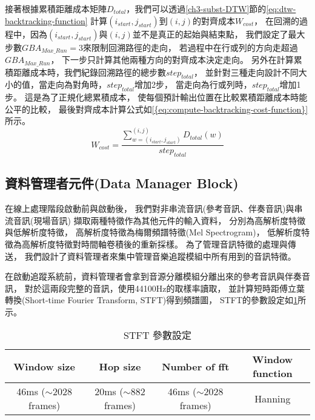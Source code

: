 \documentclass[class=NCU_thesis, crop=false]{standalone}
\begin{document}
接著根據累積距離成本矩陣$D_{total}$，我們可以透過\ref{ch3-subst-DTW}節的\cref{eq:dtw-backtracking-function}
計算$(i_{start}, j_{start})$到$(i, j)$的對齊成本$W_{cost}$，
在回溯的過程中，因為$(i_{start}, j_{start})$與$(i, j)$並不是真正的起始與結束點，
我們設定了最大步數$GBA_{Max\_Run}=3$來限制回溯路徑的走向，
若過程中在行或列的方向走超過$GBA_{Max\_Run}$，
下一步只計算其他兩種方向的對齊成本決定走向。
另外在計算累積距離成本時，我們紀錄回溯路徑的總步數$step_{total}$，
並針對三種走向設計不同大小的值，當走向為對角時，$step_{total}$增加2步，
當走向為行或列時，$step_{total}$增加1步。
這是為了正規化總累積成本，
使每個預計輸出位置在比較累積距離成本時能公平的比較，
最後對齊成本計算公式如\cref{{eq:compute-backtracking-cost-function}}所示。
\begin{equation}
    \label{eq:compute-backtracking-cost-function}
    W_{cost} = \frac{\sum_{w = (i_{start}, j_{start})}^{(i, j)}D_{total}(w)}{step_{total}} 
\end{equation}



\subsection{資料管理者元件(Data Manager Block)} \label{ch3-subst-data-manager}
在線上處理階段啟動前與啟動後，
我們對非串流音訊(參考音訊、伴奏音訊)與串流音訊(現場音訊)
擷取兩種特徵作為其他元件的輸入資料，
分別為高解析度特徵與低解析度特徵，
高解析度特徵為梅爾頻譜特徵(Mel Spectrogram)\cite{abdul2022mel}，
低解析度特徵為高解析度特徵對時間軸卷積後的重新採樣。
為了管理音訊特徵的處理與傳送，
我們設計了資料管理者來集中管理音樂追蹤模組中所有用到的音訊特徵。

在啟動追蹤系統前，資料管理者會拿到音源分離模組分離出來的參考音訊與伴奏音訊，
對於這兩段完整的音訊，使用44100Hz的取樣率讀取，
並計算短時距傅立葉轉換(Short-time Fourier Transform, STFT)得到頻譜圖，
STFT的參數設定如\cref{table:table-stft-parameter-setting}所示。

\begin{table}[h]
    \centering
    \caption{STFT 參數設定}
    \label{table:table-stft-parameter-setting}
    \begin{tabular}{|c|c|c|c|}
        \hline
        \multicolumn{1}{|c|}{Window size} & \multicolumn{1}{|c|}{Hop size} & \multicolumn{1}{|c|}{Number of fft} & \multicolumn{1}{|c|}{Window function}\\
        \hline
        46ms ($\sim 2028$ frames) & 20ms ($\sim 882$ frames) & 46ms ($\sim 2028$ frames) & Hanning\\
        \hline
    \end{tabular}
\end{table}
\end{document}
